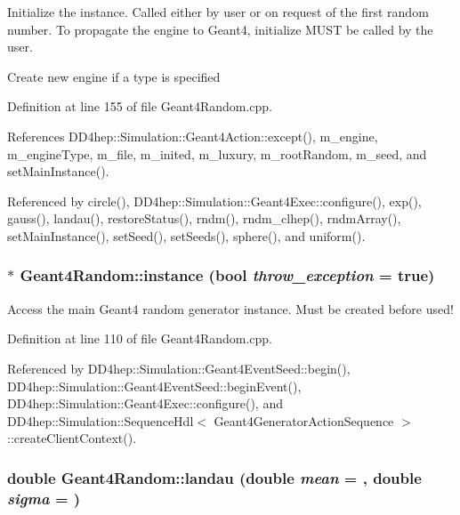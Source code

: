 Initialize the instance. Called either by user or on request of the first random number. To propagate the engine to Geant4, initialize MUST be called by the user. 

Create new engine if a type is specified 

Definition at line 155 of file Geant4Random.cpp.

References DD4hep::Simulation::Geant4Action::except(), m\_\-engine, m\_\-engineType, m\_\-file, m\_\-inited, m\_\-luxury, m\_\-rootRandom, m\_\-seed, and setMainInstance().

Referenced by circle(), DD4hep::Simulation::Geant4Exec::configure(), exp(), gauss(), landau(), restoreStatus(), rndm(), rndm\_\-clhep(), rndmArray(), setMainInstance(), setSeed(), setSeeds(), sphere(), and uniform().\hypertarget{class_d_d4hep_1_1_simulation_1_1_geant4_random_a76e4bbadf0c58d9f6ee05decdd200fe6}{
\subsubsection[{instance}]{ $\ast$ Geant4Random::instance (bool {\em throw\_\-exception} = {\ttfamily true})}}
\label{class_d_d4hep_1_1_simulation_1_1_geant4_random_a76e4bbadf0c58d9f6ee05decdd200fe6}


Access the main Geant4 random generator instance. Must be created before used! 

Definition at line 110 of file Geant4Random.cpp.

Referenced by DD4hep::Simulation::Geant4EventSeed::begin(), DD4hep::Simulation::Geant4EventSeed::beginEvent(), DD4hep::Simulation::Geant4Exec::configure(), and DD4hep::Simulation::SequenceHdl$<$ Geant4GeneratorActionSequence $>$::createClientContext().\hypertarget{class_d_d4hep_1_1_simulation_1_1_geant4_random_a44860eb96afcbda002a7845e8319eb4f}{
\subsubsection[{landau}]{\setlength{\rightskip}{0pt plus 5cm}double Geant4Random::landau (double {\em mean} = {}, \/  double {\em sigma} = {})}}
\label{class_d_d4hep_1_1_simulation_1_1_geant4_random_a44860eb96afcbda002a7845e8319eb4f}


